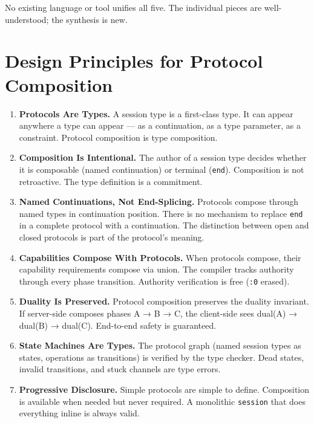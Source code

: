 \documentclass[11pt]{article}
\begin{document}
No existing language or tool unifies all five. The individual pieces are
well-understood; the synthesis is new.
\section{Design Principles for Protocol Composition}
\label{sec:org599fa57}

\begin{enumerate}
\item \textbf{Protocols Are Types.} A session type is a first-class type. It can appear
anywhere a type can appear --- as a continuation, as a type parameter, as a
constraint. Protocol composition is type composition.

\item \textbf{Composition Is Intentional.} The author of a session type decides whether
it is composable (named continuation) or terminal (\texttt{end}). Composition is
not retroactive. The type definition is a commitment.

\item \textbf{Named Continuations, Not End-Splicing.} Protocols compose through named
types in continuation position. There is no mechanism to replace \texttt{end} in a
complete protocol with a continuation. The distinction between open and
closed protocols is part of the protocol's meaning.

\item \textbf{Capabilities Compose With Protocols.} When protocols compose, their
capability requirements compose via union. The compiler tracks authority
through every phase transition. Authority verification is free (\texttt{:0} erased).

\item \textbf{Duality Is Preserved.} Protocol composition preserves the duality
invariant. If server-side composes phases A → B → C, the client-side sees
dual(A) → dual(B) → dual(C). End-to-end safety is guaranteed.

\item \textbf{State Machines Are Types.} The protocol graph (named session types as
states, operations as transitions) is verified by the type checker. Dead
states, invalid transitions, and stuck channels are type errors.

\item \textbf{Progressive Disclosure.} Simple protocols are simple to define. Composition
is available when needed but never required. A monolithic \texttt{session} that
does everything inline is always valid.
\end{enumerate}
\end{document}
